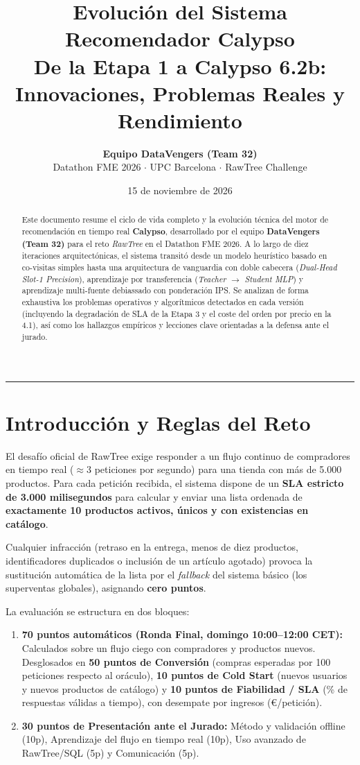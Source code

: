 \documentclass[11pt,a4paper]{article}
\title{\vspace{-1cm}\textbf{\huge\color{primary} Evolución del Sistema Recomendador Calypso}\\[0.3cm]
\Large De la Etapa 1 a Calypso 6.2b: Innovaciones, Problemas Reales y Rendimiento}
\author{\textbf{Equipo DataVengers (Team 32)} \\ Datathon FME 2026 $\cdot$ UPC Barcelona $\cdot$ RawTree Challenge}
\date{15 de noviembre de 2026}
\begin{document}
\maketitle
\thispagestyle{fancy}

\begin{abstract}
\noindent Este documento resume el ciclo de vida completo y la evolución técnica del motor de recomendación en tiempo real \textbf{Calypso}, desarrollado por el equipo \textbf{DataVengers (Team 32)} para el reto \textit{RawTree} en el Datathon FME 2026. A lo largo de diez iteraciones arquitectónicas, el sistema transitó desde un modelo heurístico basado en co-visitas simples hasta una arquitectura de vanguardia con doble cabecera (\textit{Dual-Head Slot-1 Precision}), aprendizaje por transferencia (\textit{Teacher $\to$ Student MLP}) y aprendizaje multi-fuente debiassado con ponderación IPS. Se analizan de forma exhaustiva los problemas operativos y algorítmicos detectados en cada versión (incluyendo la degradación de SLA de la Etapa 3 y el coste del orden por precio en la 4.1), así como los hallazgos empíricos y lecciones clave orientadas a la defensa ante el jurado.
\end{abstract}

\hrule
\vspace{0.4cm}

\section{Introducción y Reglas del Reto}

El desafío oficial de RawTree exige responder a un flujo continuo de compradores en tiempo real ($\approx 3$ peticiones por segundo) para una tienda con más de 5.000 productos. Para cada petición recibida, el sistema dispone de un \textbf{SLA estricto de 3.000 milisegundos} para calcular y enviar una lista ordenada de \textbf{exactamente 10 productos activos, únicos y con existencias en catálogo}. 

Cualquier infracción (retraso en la entrega, menos de diez productos, identificadores duplicados o inclusión de un artículo agotado) provoca la sustitución automática de la lista por el \textit{fallback} del sistema básico (los superventas globales), asignando \textbf{cero puntos}.

La evaluación se estructura en dos bloques:
\begin{enumerate}[noitemsep]
    \item \textbf{70 puntos automáticos (Ronda Final, domingo 10:00--12:00 CET):} Calculados sobre un flujo ciego con compradores y productos nuevos. Desglosados en \textbf{50 puntos de Conversión} (compras esperadas por 100 peticiones respecto al oráculo), \textbf{10 puntos de Cold Start} (nuevos usuarios y nuevos productos de catálogo) y \textbf{10 puntos de Fiabilidad / SLA} (\% de respuestas válidas a tiempo), con desempate por ingresos (€/petición).
    \item \textbf{30 puntos de Presentación ante el Jurado:} Método y validación offline (10p), Aprendizaje del flujo en tiempo real (10p), Uso avanzado de RawTree/SQL (5p) y Comunicación (5p).
\end{enumerate}
\end{document}
